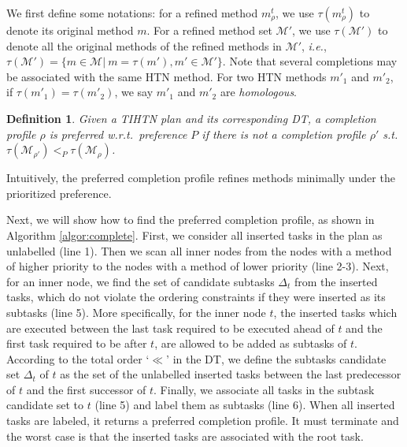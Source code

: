 \documentclass[letterpaper]{article} %
\newtheorem{definition}{Definition}
\newcommand{\Methods}{\mathcal{M}}
\newcommand{\aspprec}{\ll}
\newcommand{\improveFunction}{\rho}
\newcommand{\prefer}{\leq_P}
\newcommand{\strictPrefer}{<_P}
\newcommand{\complete}{\tau}
\newcommand{\inverseComplete}{\complete}
\newcommand{\insertTasksof}{T^\mathtt{add}}
\newcommand{\SubTCandidates}{\Delta_t}
\begin{document}
We first define some notations:
for a refined method $m^t_\improveFunction$, we use $\inverseComplete(m^t_\improveFunction)$ to denote its original method $m$. %
For a refined method set $\Methods'$, we use $\inverseComplete(\Methods')$ to denote all the original methods of the refined methods in $\Methods'$, \emph{i.e.}, $\inverseComplete(\Methods')\!=\!\{m \!\in\! \Methods | \ m \!=\! \inverseComplete(m'), m' \in \Methods'\}$.
Note that several completions may be associated with the same HTN method.
For two HTN methods $m'_1$ and $m'_2$, if $\inverseComplete(m'_1) = \inverseComplete(m'_2)$, we say $m'_1$ and $m'_2$ are \emph{homologous}.


\begin{definition}%
Given a TIHTN plan and its corresponding DT, a completion profile $\improveFunction$ is preferred \emph{w.r.t.}\ preference $P$ if there is not a completion profile $\improveFunction'$ s.t. $\inverseComplete(\Methods_{\improveFunction'}) \strictPrefer \inverseComplete(\Methods_{\improveFunction})$. %
\end{definition}
Intuitively, the preferred completion profile refines methods minimally under the prioritized preference.

Next, we will show how to find the preferred completion profile, as shown in Algorithm \ref{algor:complete}.
First, we consider all inserted tasks in the plan as unlabelled (line 1).
Then we scan all inner nodes from the nodes with a method of higher priority to the nodes with a method of lower priority (line 2-3).
Next, for an inner node, we find the set of candidate subtasks $\SubTCandidates$ from the inserted tasks, which do not violate the ordering constraints if they were inserted as its subtasks (line 5).
More specifically, for the inner node $t$, the inserted tasks which are executed between the last task required to be executed ahead of $t$ and the first task required to be after $t$, are allowed to be added as subtasks of $t$.
According to the total order `$\aspprec$' in the DT,
we define the subtasks candidate set $\SubTCandidates$ of $t$ as the set of the unlabelled inserted tasks between the last predecessor of $t$ and the first successor of $t$.
Finally, we associate all tasks in the subtask candidate set to $t$ (line 5) and label them as subtasks (line 6).
When all inserted tasks are labeled, it returns a preferred completion profile.
It must terminate and the worst case is that the inserted tasks are associated with the root task.
\end{document}

